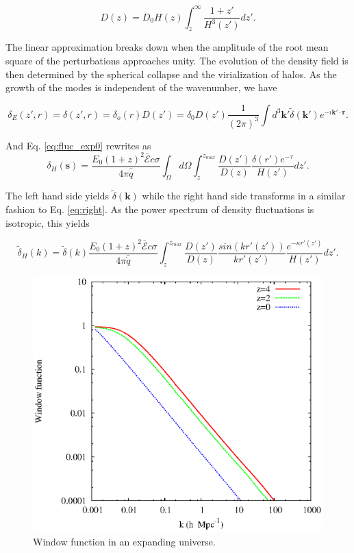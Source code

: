 \documentclass[twocolumns]{emulateapj}
\begin{document}
\begin{equation}
  \label{eq:growth_1}
  D(z)=D_0H(z)\int_z^{\infty}\frac{1+z'}{H^3(z')}dz'.
\end{equation}

The linear approximation breaks down when the amplitude of the root mean square of the perturbations approaches unity. The evolution of the density field is then determined by the spherical collapse \citep{1972ApJ...176....1G} and the virialization of halos. As the growth of the modes is independent of the wavenumber, we have

\begin{equation}
  \label{eq:FT_delta}
  \delta_E(z',r)=\delta(z',r)=\delta_o(r)D(z')=\delta_0D(z')\frac{1}{(2\pi)^3}\int d^3\mathbf{k'} \tilde{\delta}(\mathbf{k'}) e^{-i\mathbf{k'}\cdot\mathbf{r}}.
\end{equation}


And Eq. \ref{eq:fluc_exp0}  rewrites as
\begin{equation}
  \label{eq:heat_fluc_exp0}
  \delta_H(\mathbf{s})=\frac{ E_0(1+z)^2 \bar{\mathcal{E}} c\sigma}{4\pi\bar{\dot{q}}} \int_{\Omega}d\Omega\int_z^{z_{max}}  \frac{D(z')}{D(z)} \frac{\delta(r') e^{-\tau}}{H(z')}dz'.
\end{equation}


The left hand side yields $\tilde{\delta}(\mathbf{k})$ while the right hand side transforms in a similar fashion to Eq. \ref{eq:right}. As the power spectrum of density fluctuations is isotropic, this  yields

\begin{equation}
  \label{eq:heat_fluc_exp1}
  \tilde{\delta}_H(k)=\tilde{\delta}(k) \frac{E_0(1+z)^2\bar{\mathcal{E}}c\sigma}{4\pi\bar{\dot{q}}} \int_z^{z_{max}} \frac{D(z')}{D(z)}\frac{sin(kr'(z'))}{kr'(z')}    \frac{e^{-\kappa r'(z')}} {H(z')}  dz'.
\end{equation}

\begin{figure}[h]
  \centering
  \includegraphics[width = .45\textwidth ]{window_nobiases}
  \caption{Window function in an expanding universe.}
  \label{fig:window_nobiases}
\end{figure}
\end{document}
